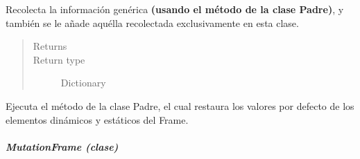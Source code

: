 \documentclass[letterpaper,10pt,english]{sphinxmanual}
\begin{document}
\begin{fulllineitems}
\begin{fulllineitems}
\label{View/Main/GeneticOperator/TemplateGeneticOperator/CrossoverFrame:View.Main.GeneticOperator.CrossoverFrame.CrossoverFrame.get_information}
Recolecta la información genérica \textbf{(usando el método de la clase Padre)}, y también
se le añade aquélla recolectada exclusivamente en esta clase.
\begin{quote}\begin{description}
\item[{Returns}] \leavevmode



\item[{Return type}] \leavevmode
Dictionary

\end{description}\end{quote}

\end{fulllineitems}


\begin{fulllineitems}
\label{View/Main/GeneticOperator/TemplateGeneticOperator/CrossoverFrame:View.Main.GeneticOperator.CrossoverFrame.CrossoverFrame.restore_settings}
Ejecuta el método de la clase Padre, el cual restaura los valores por 
defecto de los elementos dinámicos y estáticos del Frame.

\end{fulllineitems}


\end{fulllineitems}



\subparagraph{MutationFrame (clase)}
\label{View/Main/GeneticOperator/TemplateGeneticOperator/MutationFrame:module-View.Main.GeneticOperator.MutationFrame}\label{View/Main/GeneticOperator/TemplateGeneticOperator/MutationFrame:mutationframe-clase}\label{View/Main/GeneticOperator/TemplateGeneticOperator/MutationFrame::doc}
\end{document}
